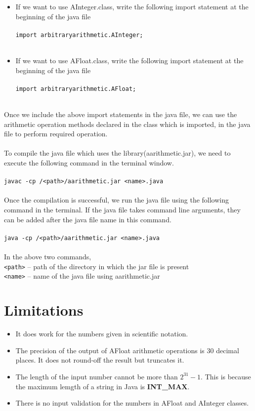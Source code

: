 \documentclass[a4paper,12pt]{article}
\begin{document}
\begin{itemize}
    \item If we want to use AInteger.class, write the following import statement at the beginning of the java file\\\\
    \texttt{import arbitraryarithmetic.AInteger;}\\\\

    \item If we want to use AFloat.class, write the following import statement at the beginning of the java file\\\\
    \texttt{import arbitraryarithmetic.AFloat;}\\\\
\end{itemize}
Once we include the above import statements in the java file, we can use the arithmetic operation methods declared in the class which is imported, in the java file to perform required operation.\\\\
To compile the java file which uses the library(aarithmetic.jar), we need to execute the following command in the terminal window.\\\\
\texttt{javac -cp /<path>/aarithmetic.jar <name>.java}\\\\
Once the compilation is successful, we run the java file using the following command in the terminal. If the java file takes command line arguments, they can be added after the java file name in this command.\\\\
\texttt{java -cp /<path>/aarithmetic.jar <name>.java}\\\\
In the above two commands,\\
\texttt{<path>} -- path of the directory in which the jar file is present\\
\texttt{<name>} -- name of the java file using aarithmetic.jar

\section{Limitations}
\begin{itemize}
    \item It does work for the numbers given in scientific notation.
    \item The precision of the output of AFloat arithmetic operations is 30 decimal places. It does not round-off the result but truncates it.
    \item The length of the input number cannot be more than $2^{31} -1$. This is because the maximum lemgth of a string in Java is \textbf{INT\_MAX}.
    \item There is no input validation for the numbers in AFloat and AInteger classes.
\end{itemize}
\end{document}
